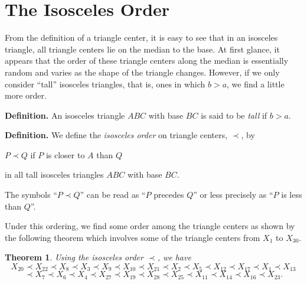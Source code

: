 \documentclass[12pt,a4paper]{amsart}
\newtheorem{theorem}{Theorem} [section]
\begin{document}
%

\section{The Isosceles Order}
\label{section:iso}

From the definition of a triangle center, it is easy to see that in an isosceles triangle,
all triangle centers lie on the median to the base.
At first glance, it appears that the order of these triangle centers along the median is
essentially random and varies as the shape of the triangle changes.
However, if we only consider ``tall'' isosceles triangles, that is, ones
in which $b>a$, we find a little more order.

\goodbreak

\textbf{Definition.}
An isosceles triangle $ABC$ with base $BC$ is said to be \emph{tall} if $b>a$.

\textbf{Definition.}
We define the \emph{isosceles order} on triangle centers, $\prec$, by

\centerline{$P\prec Q$ if $P$ is closer to $A$ than $Q$}
\centerline{in all tall isosceles triangles $ABC$ with base $BC$.}

The symbols ``$P\prec Q$'' can be read as ``$P$ precedes $Q$'' or less precisely as ``$P$ is less than $Q$''.

Under this ordering, we find some order among the triangle centers as shown by the following theorem
which involves some of the triangle centers from $X_1$ to $X_{30}$.

\begin{theorem}
\label{thm:isosceles}
Using the isosceles order $\prec$, we have
$$X_{20}\prec  X_{22}\prec  X_8 \prec  X_3\prec  X_9\prec  X_{10}\prec  X_{21}\prec  X_2\prec  X_5\prec  X_{12}\prec  X_{17}\prec  X_1\prec  X_{13}$$
$$\prec  X_7\prec  X_6\prec X_4\prec  X_{27}\prec  X_{19}\prec  X_{28}\prec  X_{25}\prec  X_{11}\prec  X_{14}\prec  X_{16}\prec  X_{23}.$$
\end{theorem}
\end{document}
